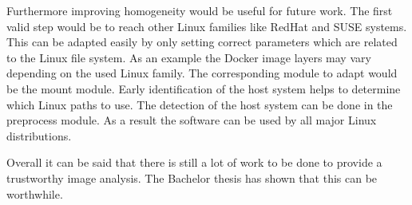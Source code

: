 Furthermore improving homogeneity would be useful for future work.
The first valid step would be to reach other Linux families like RedHat and SUSE systems.
This can be adapted easily by only setting correct parameters which are related to the Linux file system.
As an example the Docker image layers may vary depending on the used Linux family.
The corresponding module to adapt would be the mount module.
Early identification of the host system helps to determine which Linux paths to use.
The detection of the host system can be done in the preprocess module.
As a result the software can be used by all major Linux distributions.

Overall it can be said that there is still a lot of work to be done to provide a trustworthy image analysis.
The Bachelor thesis has shown that this can be worthwhile.